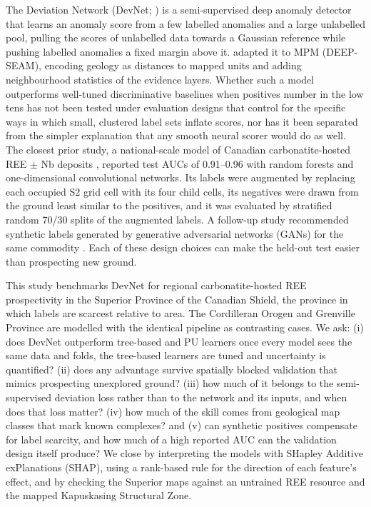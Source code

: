 \documentclass[pdflatex,sn-apa]{sn-jnl}
\begin{document}
The Deviation Network (DevNet; \citealp{Pang2019}) is a semi-supervised deep anomaly detector that learns an anomaly score from a few labelled anomalies and a large unlabelled pool, pulling the scores of unlabelled data towards a Gaussian reference while pushing labelled anomalies a fixed margin above it. \citet{Luo2026} adapted it to MPM (DEEP-SEAM), encoding geology as distances to mapped units and adding neighbourhood statistics of the evidence layers. Whether such a model outperforms well-tuned discriminative baselines when positives number in the low tens has not been tested under evaluation designs that control for the specific ways in which small, clustered label sets inflate scores, nor has it been separated from the simpler explanation that any smooth neural scorer would do as well. The closest prior study, a national-scale model of Canadian carbonatite-hosted REE $\pm$ Nb deposits \citep{Parsa2024}, reported test AUCs of 0.91--0.96 with random forests and one-dimensional convolutional networks. Its labels were augmented by replacing each occupied S2 grid cell with its four child cells, its negatives were drawn from the ground least similar to the positives, and it was evaluated by stratified random 70/30 splits of the augmented labels. A follow-up study recommended synthetic labels generated by generative adversarial networks (GANs) for the same commodity \citep{Parsa2025}. Each of these design choices can make the held-out test easier than prospecting new ground.

This study benchmarks DevNet for regional carbonatite-hosted REE prospectivity in the Superior Province of the Canadian Shield, the province in which labels are scarcest relative to area. The Cordilleran Orogen and Grenville Province are modelled with the identical pipeline as contrasting cases. We ask: (i) does DevNet outperform tree-based and PU learners once every model sees the same data and folds, the tree-based learners are tuned and uncertainty is quantified? (ii) does any advantage survive spatially blocked validation that mimics prospecting unexplored ground? (iii) how much of it belongs to the semi-supervised deviation loss rather than to the network and its inputs, and when does that loss matter? (iv) how much of the skill comes from geological map classes that mark known complexes? and (v) can synthetic positives compensate for label scarcity, and how much of a high reported AUC can the validation design itself produce? We close by interpreting the models with SHapley Additive exPlanations (SHAP), using a rank-based rule for the direction of each feature's effect, and by checking the Superior maps against an untrained REE resource and the mapped Kapuskasing Structural Zone.
\end{document}

